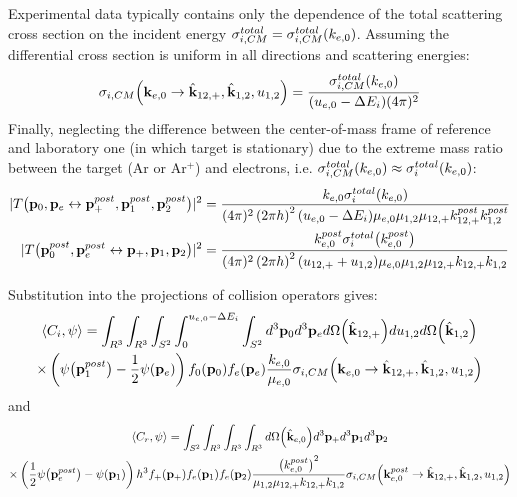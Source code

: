 \documentclass{article}[draft]
\begin{document}
Experimental data typically contains only the dependence of the total scattering cross section on the incident energy $\sigma^{total}_{i,CM} = \sigma^{total}_{i,CM}\of{k_{e,0}}$. Assuming the differential cross section is uniform in all directions and scattering energies: 
\begin{align*}
\sigma_{i,CM}\of{\vect{k}_{e,0} \rightarrow \hat{\vect{k}}_{12,+}, \hat{\vect{k}}_{1,2}, u_{1,2}}
= \frac{ \sigma^{total}_{i,CM}\of{k_{e,0}} }
{ (u_{e,0}-\Delta E_i) (4\pi)^2 }
\end{align*}
Finally, neglecting the difference between the center-of-mass frame of reference and laboratory one (in which target is stationary) due to the extreme mass ratio between the target (Ar or Ar$^+$) and electrons, i.e. $\sigma^{total}_{i,CM}\of{k_{e,0}} \approx \sigma^{total}_{i}\of{k_{e,0}}$:
\begin{align*}
| T\of{\vect{p}_0, \vect{p}_e \leftrightarrow \vect{p}_+^{post}, \vect{p}_1^{post}, \vect{p}_2^{post}} |^2
&= \frac{ k_{e,0} \sigma^{total}_{i}\of{k_{e,0}} }
{ (4\pi)^2 \left( 2 \pi \planck \right)^2 (u_{e,0}-\Delta E_i) 
\mu_{e,0} \mu_{1,2} \mu_{12,+} k^{post}_{12,+} k^{post}_{1,2} }
\\
| T\of{\vect{p}_0^{post}, \vect{p}_e^{post} \leftrightarrow \vect{p}_+, \vect{p}_1, \vect{p}_2} |^2
&= \frac{ k_{e,0}^{post} \sigma^{total}_{i}\of{k_{e,0}^{post}} }
{ (4\pi)^2 \left( 2 \pi \planck \right)^2 (u_{12,+} + u_{1,2}) 
\mu_{e,0} \mu_{1,2} \mu_{12,+} k_{12,+} k_{1,2} }
\end{align*}

Substitution into the projections of collision operators gives:
\begin{multline*}
\left< C_i, \psi \right> 
= 
\int_{R^3} \int_{R^3} 
\int_{S^2} \int_{0}^{u_{e,0} - \Delta E_i} \int_{S^2} 
d^3 \vect{p}_0 d^3 \vect{p}_e
d\Omega\of{\hat{\vect{k}}_{12,+}} 
d u_{1,2} d\Omega\of{\hat{\vect{k}}_{1,2}}
\\
\times
\left( \psi\of{\vect{p}_1^{post}}  
- \frac12 \psi\of{\vect{p}_e} \right) f_0\of{\vect{p}_0} f_e\of{\vect{p}_e} 
\frac{ k_{e,0} }
{\mu_{e,0} }
\sigma_{i,CM}\of{\vect{k}_{e,0} \rightarrow \hat{\vect{k}}_{12,+}, \hat{\vect{k}}_{1,2}, u_{1,2}}
\end{multline*}
and
\begin{multline*}
\left< C_r, \psi \right>  =
\int_{S^2} 
\int_{R^3} \int_{R^3} \int_{R^3} 
d \Omega\of{\hat{\vect{k}}_{e,0}}
d^3 \vect{p}_+ d^3 \vect{p}_1 d^3 \vect{p}_2 
\\
\times
\left( \frac12 \psi\of{\vect{p}_e^{post}}
- \psi\of{\vect{p}_1} \right) h^3 f_+\of{\vect{p}_+} f_e\of{\vect{p}_1}  f_e\of{\vect{p}_2} 
\frac{ \left( k_{e,0}^{post} \right)^2 }
{ \mu_{1,2} \mu_{12,+} k_{12,+} k_{1,2} }
\sigma_{i,CM}\of{\vect{k}^{post}_{e,0} \rightarrow \hat{\vect{k}}_{12,+}, \hat{\vect{k}}_{1,2}, u_{1,2}}
\end{multline*}
\end{document}
